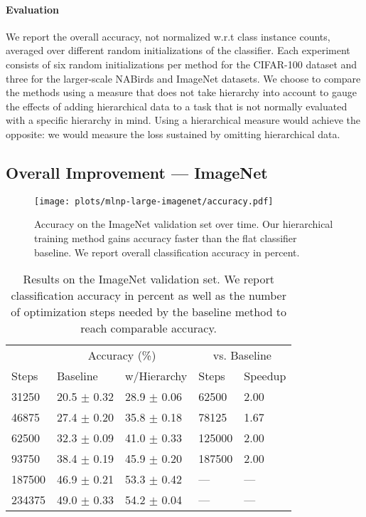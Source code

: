 \documentclass[10pt,twocolumn,letterpaper]{article}
\begin{document}
\paragraph{Evaluation}
We report the overall accuracy, not normalized w.r.t class instance counts,
averaged over different random initializations of the classifier.
Each experiment consists of six random initializations per method for the CIFAR-100
dataset and three for the larger-scale NABirds and ImageNet datasets.
We choose to compare the methods using a measure that does not
take hierarchy into account to gauge the effects of adding hierarchical data to a task
that is not normally evaluated with a specific hierarchy in mind. Using a hierarchical measure would
achieve the opposite: we would measure the loss sustained by omitting hierarchical data.

\subsection{Overall Improvement --- ImageNet}
\label{sec:exp-in}
\label{sec:exp-first}

\begin{figure}
\centering
\texttt{[image: plots/mlnp-large-imagenet/accuracy.pdf]}
\caption{Accuracy on the ImageNet validation set over time. Our hierarchical training method gains accuracy faster than the
flat classifier baseline. We report overall classification accuracy in percent.}
\label{fig:expingraph}
\end{figure}


\begin{table}
\centering
\caption{Results on the ImageNet validation set. We report classification accuracy in percent
as well as the number of optimization steps needed by the baseline method to reach comparable accuracy.}
\label{tbl:expin}
\small
\begin{tabular}{l||l|l||l|l}
 &  \multicolumn{2}{c||}{Accuracy (\%)} & \multicolumn{2}{c}{vs. Baseline}\\
Steps       &      Baseline     &       w/Hierarchy        & Steps & Speedup\\\hline

31250  &  20.5 $\pm$ 0.32  &  28.9 $\pm$ 0.06  &   62500  &  2.00 \\
46875  &  27.4 $\pm$ 0.20  &  35.8 $\pm$ 0.18  &   78125  &  1.67 \\
62500  &  32.3 $\pm$ 0.09  &  41.0 $\pm$ 0.33  &  125000  &  2.00 \\
93750  &  38.4 $\pm$ 0.19  &  45.9 $\pm$ 0.20  &  187500  &  2.00 \\
187500  &  46.9 $\pm$ 0.21  &  53.3 $\pm$ 0.42  &  ---  &  --- \\
234375  &  49.0 $\pm$ 0.33  &  54.2 $\pm$ 0.04  &  ---  &  --- \\


\end{tabular}
\end{table}
\end{document}

